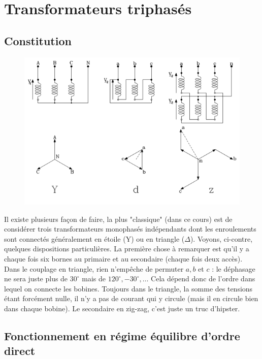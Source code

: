\section{Transformateurs triphasés}
	\subsection{Constitution}
		\begin{figure}
		\vspace{-8mm}
		\includegraphics[scale=0.45]{ch3/imager5.png}
		\end{figure}				
	Il existe plusieurs façon de faire, la plus "classique" (dans ce cours) est de 
	considérer trois transformateurs monophasés indépendants dont les enroulements 
	sont connectés généralement en étoile (Y) ou en triangle ($\Delta$). Voyons, 
	ci-contre,	quelques dispositions particulières.
	La première chose à remarquer est qu'il y a chaque fois six bornes au primaire 
	et au secondaire (chaque fois deux accès). Dans le couplage en triangle, rien 
	n'empêche de permuter $a,b$ et $c$ : le déphasage ne sera juste plus de $30^\circ$ 
	mais de $120^\circ, -30^\circ,\dots$ Cela dépend donc de l'ordre dans lequel on 
	connecte les bobines. Toujours dans le triangle, la somme des tensions étant 
	forcément nulle, il n'y a pas de courant qui y circule (mais il en circule bien 
	dans chaque bobine). Le secondaire en zig-zag, c'est juste un truc d'hipster.
	
	\subsection{Fonctionnement en régime équilibre d'ordre direct}
